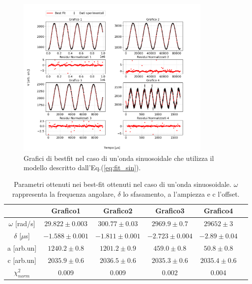 \documentclass{article}
\begin{document}
            \begin{figure}[H]            
                \centering
                \includegraphics[width=0.85\textwidth]{bestfit_sinusoid.png} %
                \caption{Grafici di bestfit nel caso di un'onda sinuosoidale che utilizza il modello descritto dall'Eq.(\ref{eq:fit_sin}).
                }
                \label{fig:bestfit_sinusoid}

            \end{figure}    



            \begin{table}[H]
                \centering
                \begin{tabular}{cccccc}
                    \hline
                               & Grafico1              &Grafico2               & Grafico3                &Grafico4 \\
                    \hline
                    $\omega$ [rad/s]    & $29.822\pm 0.003$     & $300.77 \pm 0.03$     & $2969.9\pm 0.7$         & $29652  \pm 3$ \\
                    $\delta$ [$\mu$s]   & $-1.588 \pm 0.001$    & $-1.811 \pm 0.001$    & $-2.723\pm 0.004$       & $-2.89 \pm 0.04$ \\
                    a [arb.un]          & $1240.2\pm 0.8$       & $1201.2\pm 0.9$        & $459.0 \pm 0.8$         & $50.8 \pm 0.8$ \\
                    c [arb.un]          & $2035.9 \pm 0.6$      & $2036.5 \pm 0.6$      & $2035.3 \pm 0.6$        & $2035.4 \pm 0.6$ \\
                    $\chi^{2}_{norm}$   & 0.009                 & 0.009                 & 0.002                   & 0.004 \\
                    \hline
                \end{tabular}
                \caption{Parametri ottenuti nei best-fit ottenuti nel caso di un'onda sinuosoidale. $\omega$ rappresenta la frequenza angolare, $\delta$ lo sfasamento, a l'ampiezza e c l'offset.}
                \label{tab:bestfit_sinusoid}
            \end{table}
\end{document}

